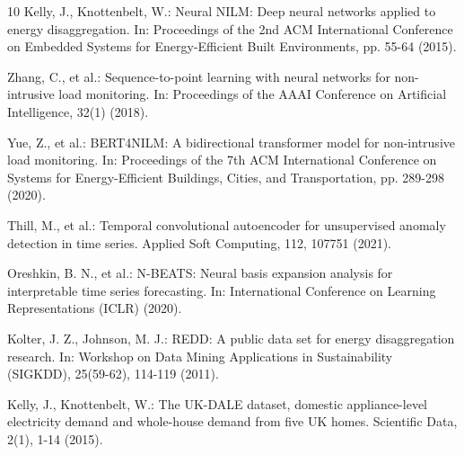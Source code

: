 \begin{thebibliography}{10}
Kelly, J., Knottenbelt, W.: Neural NILM: Deep neural networks applied to energy disaggregation. In: Proceedings of the 2nd ACM International Conference on Embedded Systems for Energy-Efficient Built Environments, pp. 55-64 (2015).

Zhang, C., et al.: Sequence-to-point learning with neural networks for non-intrusive load monitoring. In: Proceedings of the AAAI Conference on Artificial Intelligence, 32(1) (2018).

Yue, Z., et al.: BERT4NILM: A bidirectional transformer model for non-intrusive load monitoring. In: Proceedings of the 7th ACM International Conference on Systems for Energy-Efficient Buildings, Cities, and Transportation, pp. 289-298 (2020).

Thill, M., et al.: Temporal convolutional autoencoder for unsupervised anomaly detection in time series. Applied Soft Computing, 112, 107751 (2021).

Oreshkin, B. N., et al.: N-BEATS: Neural basis expansion analysis for interpretable time series forecasting. In: International Conference on Learning Representations (ICLR) (2020).

Kolter, J. Z., Johnson, M. J.: REDD: A public data set for energy disaggregation research. In: Workshop on Data Mining Applications in Sustainability (SIGKDD), 25(59-62), 114-119 (2011).

Kelly, J., Knottenbelt, W.: The UK-DALE dataset, domestic appliance-level electricity demand and whole-house demand from five UK homes. Scientific Data, 2(1), 1-14 (2015).

\end{thebibliography}
